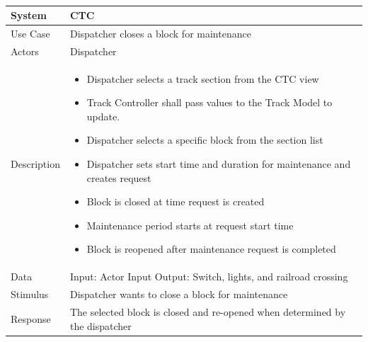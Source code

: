 \documentclass{article}
\begin{document}
    \paragraph{}
   \begin{longtable}{
    || >{\raggedright\arraybackslash}m{}
    | >{\raggedright\arraybackslash}m{}||}
    \hline
    \textbf{System} & \textbf{CTC} \\
    \hline
    Use Case & Dispatcher closes a block for maintenance\\
    \hline
    Actors & Dispatcher\\
    \hline
    Description & \begin{itemize}
        \item Dispatcher selects a track section from the CTC view
        \item Track Controller shall pass values to the Track Model to update. 
        \item Dispatcher selects a specific block from the section list
        \item Dispatcher sets start time and duration for maintenance and creates request
        \item Block is closed at time request is created
        \item Maintenance period starts at request start time
        \item Block is reopened after maintenance request is completed
    \end{itemize}\\
    \hline
    Data & Input: Actor Input \newline Output: Switch, lights, and railroad crossing\\
    \hline
    Stimulus & Dispatcher wants to close a block for maintenance\\
    \hline
    Response & The selected block is closed and re-opened when determined by the dispatcher\\
    \hline
    \end{longtable}
\end{document}
